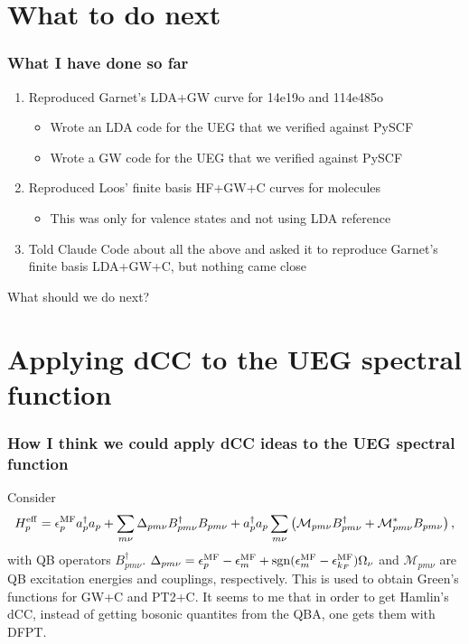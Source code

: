 \section{What to do next}
\begin{frame}
    \frametitle{What I have done so far}
\begin{enumerate}
\item Reproduced Garnet's LDA+GW curve for 14e19o and 114e485o \pause
    \begin{itemize}
        \item Wrote an LDA code for the UEG that we verified against PySCF \pause
        \item Wrote a GW code for the UEG that we verified against PySCF \pause
    \end{itemize}
\item Reproduced Loos' finite basis HF+GW+C curves for molecules \pause
    \begin{itemize}
        \item This was only for valence states and not using LDA reference \pause
    \end{itemize}
\item Told Claude Code about all the above and asked it to reproduce Garnet's finite basis LDA+GW+C, but nothing came close \pause   
\end{enumerate}
What should we do next?
\end{frame}

\section{Applying dCC to the UEG spectral function}
\begin{frame}
    \frametitle{How I think we could apply dCC ideas to the UEG spectral function}
Consider
\begin{equation}
H_p^{\rm eff}
=
\epsilon_p^{\rm MF} a_p^{\dagger} a_p
+
\sum_{m\nu}
\Delta_{pm\nu}
B_{pm\nu}^{\dagger}
B_{pm\nu}
+ a_p^{\dagger} a_p
\sum_{m\nu}
\left(
\mathcal{M}_{pm\nu}
B_{pm\nu}^{\dagger}
+
\mathcal{M}_{pm\nu}^{*}
B_{pm\nu}
\right),
\end{equation}
with QB operators $B_{pm\nu}^{\dagger}$. \pause
$\Delta_{pm\nu} = \epsilon_p^{\rm MF} - \epsilon_m^{\rm MF} + \operatorname{sgn}(\epsilon_m^{\rm MF} - \epsilon^{\rm MF}_{k_F})\Omega_\nu$ and $\mathcal{M}_{pm\nu}$ are QB excitation energies and couplings, respectively. \pause
This is used to obtain Green's functions for GW+C and PT2+C. \pause It seems to me that in order to get Hamlin's dCC, instead of getting bosonic quantites from the QBA, one gets them with DFPT.
\end{frame}
